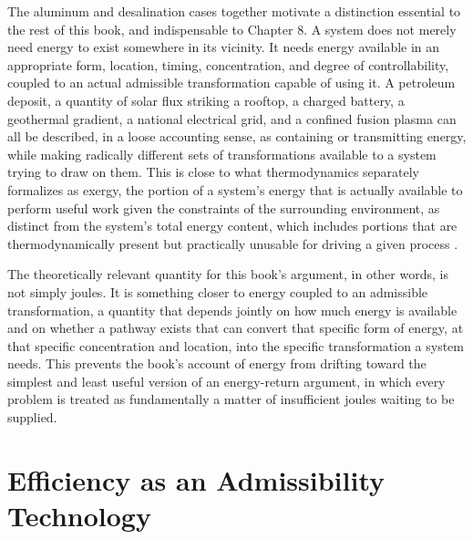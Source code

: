 \documentclass[11pt]{book}
\begin{document}
The aluminum and desalination cases together motivate a distinction essential to the rest of this book, and indispensable to Chapter 8. A system does not merely need energy to exist somewhere in its vicinity. It needs energy available in an appropriate form, location, timing, concentration, and degree of controllability, coupled to an actual admissible transformation capable of using it. A petroleum deposit, a quantity of solar flux striking a rooftop, a charged battery, a geothermal gradient, a national electrical grid, and a confined fusion plasma can all be described, in a loose accounting sense, as containing or transmitting energy, while making radically different sets of transformations available to a system trying to draw on them. This is close to what thermodynamics separately formalizes as exergy, the portion of a system's energy that is actually available to perform useful work given the constraints of the surrounding environment, as distinct from the system's total energy content, which includes portions that are thermodynamically present but practically unusable for driving a given process \cite{szargut1988}.

The theoretically relevant quantity for this book's argument, in other words, is not simply joules. It is something closer to energy coupled to an admissible transformation, a quantity that depends jointly on how much energy is available and on whether a pathway exists that can convert that specific form of energy, at that specific concentration and location, into the specific transformation a system needs. This prevents the book's account of energy from drifting toward the simplest and least useful version of an energy-return argument, in which every problem is treated as fundamentally a matter of insufficient joules waiting to be supplied.

\section{Efficiency as an Admissibility Technology}
\end{document}
